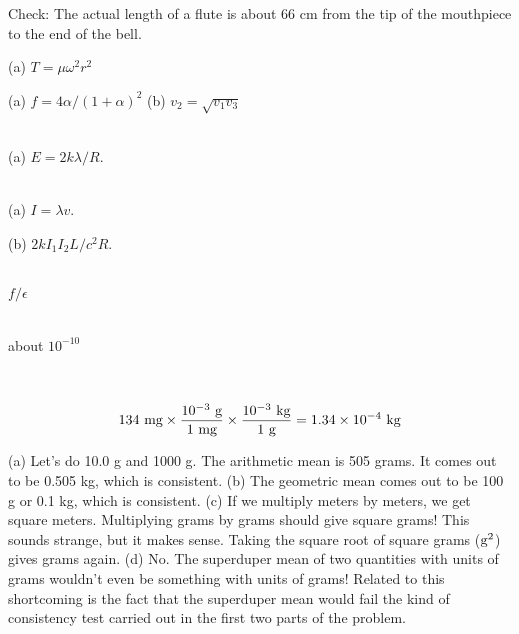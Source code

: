 \label{hwans:flute}
Check: The actual length of a flute is about 66 cm from
the tip of the mouthpiece to the end of the bell.

\label{hwans:lasso}
(a) $T=\mu \omega^2 r^2$

\label{hwans:maxtransmission}
(a) $f=4\alpha/(1+\alpha)^2$ (b) $v_2=\sqrt{v_1 v_3}$

\noindent{}\\
\label{hwans:estrips} (a) $E=2k\lambda/R$.

\noindent{}\\
\label{hwans:linechargecurrent} (a) $I=\lambda v$.

\label{hwans:forcebetweentwowires} (b) $2kI_1I_2L/c^2R$.

\noindent{}\\
\label{hwans:close-to-focal-length} $f/\epsilon$

\noindent{}\\
\label{hwans:photon-mass} about $10^{-10}$


\noindent{}

\noindent{}\\


\begin{equation*}
  134\ \zu{mg} \times \frac{10^{-3}\ \gunit}{1\ \zu{mg}} \times \frac{10^{-3}\ \kgunit}{1\ \zu{g}} = 1.34\times10^{-4}\ \kgunit
\end{equation*}

(a) Let's do 10.0 g and 1000 g. The arithmetic mean
is 505 grams. It comes out to be 0.505 kg, which is
consistent. (b) The geometric mean comes out to be 100 g
or 0.1 kg, which is consistent. (c) If we multiply meters by
meters, we get square meters. Multiplying grams by grams
should give square grams! This sounds strange, but it makes
sense. Taking the square root of square grams ($\textup{g}^2$) gives
grams again. (d) No. The superduper mean of two quantities
with units of grams wouldn't even be something with units of
grams! Related to this shortcoming is the fact that the
superduper mean would fail the kind of consistency test
carried out in the first two parts of the problem.


